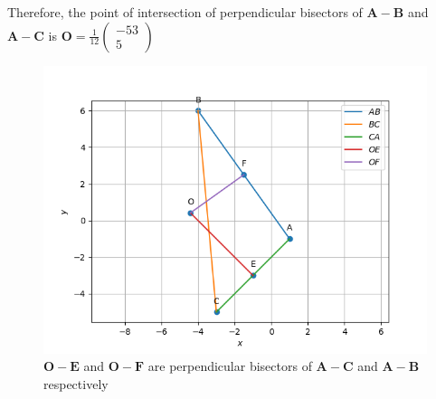 \documentclass[journal,12pt,twocolumn]{IEEEtran}
\theoremstyle{remark}
\newcommand{\myvec}[1]{\ensuremath{\begin{pmatrix}#1\end{pmatrix}}}
\let\vec\mathbf
\begin{document}
Therefore, the point of intersection of perpendicular bisectors of $\vec{A}-\vec{B}$ and $\vec{A}-\vec{C}$ is $\vec{O} = \frac{1}{12}\myvec{-53\\5}$
\begin{figure}[h]

\centering

\includegraphics[width=\columnwidth]{solutions/1/4/2/figs/Figure_1}

\caption{$\vec{O}-\vec{E}$ and $\vec{O}-\vec{F}$ are perpendicular bisectors of $\vec{A}-\vec{C}$ and $\vec{A}-\vec{B}$ respectively}

\label{fig:Figure_2}

\end{figure}
\end{document}
